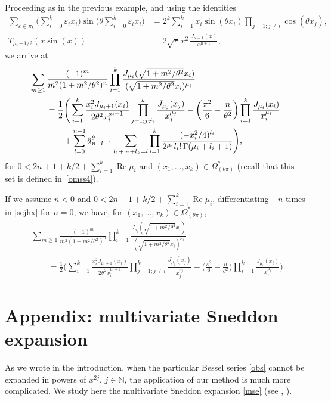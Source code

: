 \documentclass[12pt,leqno]{amsart}
\numberwithin{equation}{section}
\theoremstyle{plain}
\newcommand{\NN}{\mathbb{N}}
\newcommand{\eps}{\varepsilon}
\renewcommand{\Re}{\operatorname{Re}}
\begin{document}
Proceeding as in the previous example, and using the identities
\begin{align*}
\sum_{\eps\in\pi_k} \Big(\sum_{i=0}^k\eps_ix_i\Big)
\sin\Big( \theta \sum_{i=0}^k \eps_ix_i \Big)
&= 2^k \sum_{i=1}^kx_i\sin(\theta x_i)\prod_{j=1;j\not=i}\cos(\theta x_j), \\
T_{\mu,-1/2}(x\sin(x)) &= 2\sqrt \pi x^2 \,\frac{J_{\mu+1}(x)}{x^{\mu+1}},
\end{align*}
we arrive at
\begin{align}
\label{sejhx}
& \sum_{m\ge 1} \frac{(-1)^m}{m^2(1+m^2/\theta ^2)^{n}}
\prod_{i=1}^k \frac{J_{\mu_i}(\sqrt{1+m^2/\theta ^2}x_i)}
{(\sqrt{1+m^2/\theta ^2}x_i)^{\mu_i}}\\\nonumber
&\qquad = \frac{1}{2} \Bigg( \sum_{i=1}^k
 \frac{x_i^2J_{\mu_i+1}(x_i)}{2\theta^2 x_i^{\mu_i+1}}
 \prod_{j=1;j\not=i}^k\frac{J_{\mu_j}(x_j)}{ x_j^{\mu_j}}
- \bigg(\frac{\pi^2}{6}-\frac{n}{\theta ^2}\bigg)
\prod_{i=1}^k\frac{J_{\mu_i}(x_i)}{x_i^{\mu_i}} \\
\nonumber
&\qquad\qquad\null+ \sum_{l=0}^{n-1} \hat a_{n-l-1}^\theta \sum_{l_1+\cdots+l_k=l}
\prod_{i=1}^k\frac{(-x_i^2/4)^{l_i}}
{2^{\mu_i}l_i!\,\Gamma(\mu_i + l_i +1)} \Bigg),
\end{align}
for $0<2n+1+k/2+ \sum_{i=1}^k\Re \mu_i$ and $(x_1,\dots, x_k)\in\Omega_{(\theta\pi)}^*$ (recall that this set is defined in~\eqref{omss4}).

If we assume $n<0$ and $0<2n+1+k/2+ \sum_{i=1}^k\Re \mu_i$, differentiating $-n$ times in \eqref{sejhx} for $n=0$, we have, for
$(x_1,\dots, x_k)\in\Omega_{(\theta \pi)}^*$,
\begin{align*}
& \sum_{m\ge 1} \frac{(-1)^m}{m^2(1+m^2/\theta ^2)^{n}}
\prod_{i=1}^k\frac{J_{\mu_i}(\sqrt{1+m^2/\theta ^2}x_i)}
{(\sqrt{1+m^2/\theta ^2}x_i)^{\mu_i}} \\
\nonumber
&\qquad = \frac{1}{2} \Bigg( \sum_{i=1}^k \frac{x_i^2J_{\mu_i+1}(x_i)}{2\theta^2 x_i^{\mu_i+1}} 
\prod_{j=1;j\not=i}^k \frac{J_{\mu_j}(x_j)}{ x_j^{\mu_j}}
- \bigg(\frac{\pi^2}{6}-\frac{n}{\theta ^2}\bigg)
\prod_{i=1}^k\frac{J_{\mu_i}(x_i)}{x_i^{\mu_i}} \Bigg).
\end{align*}

\section{Appendix: multivariate Sneddon expansion}
\label{sec:Apen}

As we wrote in the introduction, when the particular Bessel series \eqref{obs} cannot be expanded in powers of $x^{2j}$, $j\in \NN$,
the application of our method is much more complicated.
We study here the multivariate Sneddon expansion \eqref{mse} (see \cite[\S\,2.2]{Sne}, \cite{Mar, DPVS}).
\end{document}
